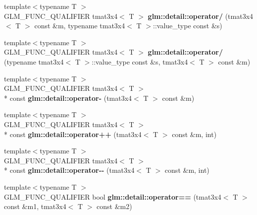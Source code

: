 \begin{DoxyCompactItemize}
\item 
\hypertarget{namespaceglm_1_1detail_af44f69b4557cd3251715e75169a1ff32}{{\footnotesize template$<$typename T $>$ }\\G\-L\-M\-\_\-\-F\-U\-N\-C\-\_\-\-Q\-U\-A\-L\-I\-F\-I\-E\-R tmat3x4$<$ T $>$ {\bfseries glm\-::detail\-::operator/} (tmat3x4$<$ T $>$ const \&m, typename tmat3x4$<$ T $>$\-::value\-\_\-type const \&s)}\label{namespaceglm_1_1detail_af44f69b4557cd3251715e75169a1ff32}

\item 
\hypertarget{namespaceglm_1_1detail_a133f8fff58a9e20686dfe57e38ad4bf7}{{\footnotesize template$<$typename T $>$ }\\G\-L\-M\-\_\-\-F\-U\-N\-C\-\_\-\-Q\-U\-A\-L\-I\-F\-I\-E\-R tmat3x4$<$ T $>$ {\bfseries glm\-::detail\-::operator/} (typename tmat3x4$<$ T $>$\-::value\-\_\-type const \&s, tmat3x4$<$ T $>$ const \&m)}\label{namespaceglm_1_1detail_a133f8fff58a9e20686dfe57e38ad4bf7}

\item 
\hypertarget{namespaceglm_1_1detail_a9f66509dfdc347b11905529b91f4c6e0}{{\footnotesize template$<$typename T $>$ }\\G\-L\-M\-\_\-\-F\-U\-N\-C\-\_\-\-Q\-U\-A\-L\-I\-F\-I\-E\-R tmat3x4$<$ T $>$\\*
 const {\bfseries glm\-::detail\-::operator-\/} (tmat3x4$<$ T $>$ const \&m)}\label{namespaceglm_1_1detail_a9f66509dfdc347b11905529b91f4c6e0}

\item 
\hypertarget{namespaceglm_1_1detail_a8e5ec373b9d53569ce683de9047fea28}{{\footnotesize template$<$typename T $>$ }\\G\-L\-M\-\_\-\-F\-U\-N\-C\-\_\-\-Q\-U\-A\-L\-I\-F\-I\-E\-R tmat3x4$<$ T $>$\\*
 const {\bfseries glm\-::detail\-::operator++} (tmat3x4$<$ T $>$ const \&m, int)}\label{namespaceglm_1_1detail_a8e5ec373b9d53569ce683de9047fea28}

\item 
\hypertarget{namespaceglm_1_1detail_a029b4b50b30ba98970ffaeec158cf198}{{\footnotesize template$<$typename T $>$ }\\G\-L\-M\-\_\-\-F\-U\-N\-C\-\_\-\-Q\-U\-A\-L\-I\-F\-I\-E\-R tmat3x4$<$ T $>$\\*
 const {\bfseries glm\-::detail\-::operator-\/-\/} (tmat3x4$<$ T $>$ const \&m, int)}\label{namespaceglm_1_1detail_a029b4b50b30ba98970ffaeec158cf198}

\item 
\hypertarget{namespaceglm_1_1detail_ac9dfe3a4276deb126dead3fe196bb81d}{{\footnotesize template$<$typename T $>$ }\\G\-L\-M\-\_\-\-F\-U\-N\-C\-\_\-\-Q\-U\-A\-L\-I\-F\-I\-E\-R bool {\bfseries glm\-::detail\-::operator==} (tmat3x4$<$ T $>$ const \&m1, tmat3x4$<$ T $>$ const \&m2)}\label{namespaceglm_1_1detail_ac9dfe3a4276deb126dead3fe196bb81d}


\end{DoxyCompactItemize}
